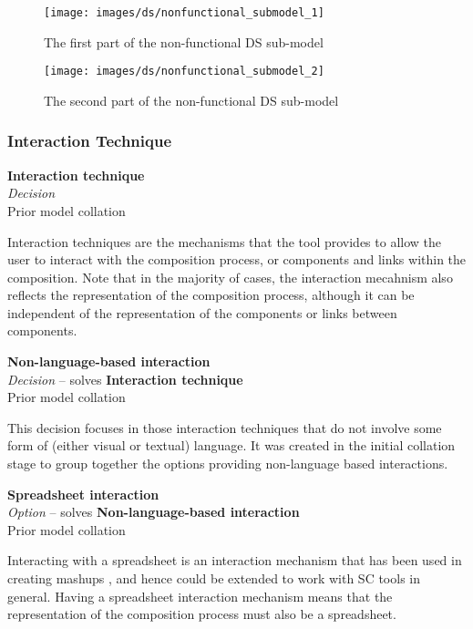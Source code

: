 \begin{figure}[htb]
	\centering
	\texttt{[image: images/ds/nonfunctional\_submodel\_1]}
	\caption{The first part of the non-functional DS sub-model}
	\label{ds:fig:nonfunctional1}
\end{figure}


\begin{figure}[htb]
	\centering
	\texttt{[image: images/ds/nonfunctional\_submodel\_2]}
	\caption{The second part of the non-functional DS sub-model}
	\label{ds:fig:nonfunctional2}
\end{figure}

\clearpage

\subsubsection{Interaction Technique}

\textbf{Interaction technique} \\ \emph{Decision} \\ Prior model collation \cite{Aghaee2012}

Interaction techniques are the mechanisms that the tool provides to allow the user to interact with the composition process, or components and links within the composition. Note that in the majority of cases, the interaction mecahnism also reflects the representation of the composition process, although it can be independent of the representation of the components or links between components.

\textbf{Non-language-based interaction} \\ \emph{Decision} -- solves \textbf{Interaction technique} \\ Prior model collation

This decision focuses in those interaction techniques that do not involve some form of (either visual or textual) language. It was created in the initial collation stage to group together the options providing non-language based interactions.

\textbf{Spreadsheet interaction} \\ \emph{Option} -- solves \textbf{Non-language-based interaction} \\ Prior model collation \cite{Aghaee2012,Minhas2012,Fischer2009}

Interacting with a spreadsheet is an interaction mechanism that has been used in creating mashups \cite{Skrobo2011}, and hence could be extended to work with SC tools in general. Having a spreadsheet interaction mechanism means that the representation of the composition process must also be a spreadsheet.

